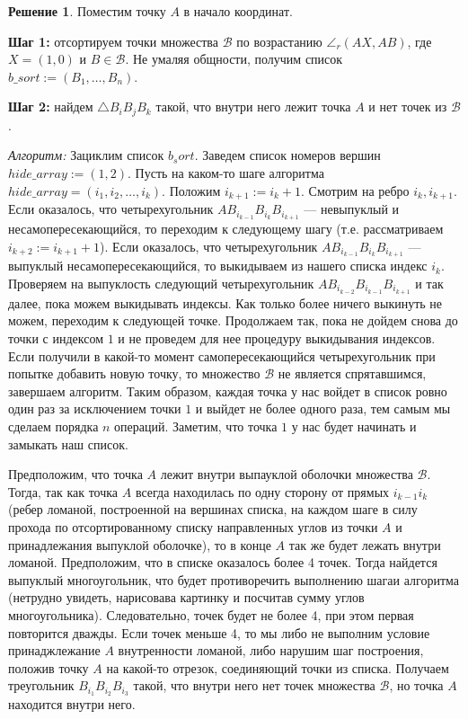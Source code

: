 \documentclass[12pt]{article}
\theoremstyle{definition}
\newtheorem*{solution}{Решение}
\theoremstyle{plain}
\theoremstyle{remark}
\begin{document}
\begin{solution}
    Поместим точку $A$ в начало координат.

    \textbf{Шаг 1:} отсортируем точки множества $\mathcal{B}$ по возрастанию $\angle_r (AX, AB)$, где $X = (1, 0)$ и $B \in \mathcal{B}$. Не умаляя общности, получим список $b\_sort := (B_1, \ldots, B_n)$.

    \textbf{Шаг 2:} найдем $\triangle B_iB_jB_k$ такой, что внутри него лежит точка $A$ и нет точек из $\mathcal{B}$.

    \textit{Алгоритм:}
    Зациклим список $b_sort$. Заведем список номеров вершин $hide\_array := (1, 2)$. Пусть на каком-то шаге алгоритма $hide\_array = (i_1, i_2, \ldots, i_k)$. Положим $i_{k + 1} := i_k + 1$. Смотрим на ребро $i_k, i_{k + 1}$. Если оказалось, что четырехугольник $AB_{i_{k - 1}}B_{i_k}B_{i_{k + 1}}$ --- невыпуклый и несамопересекающийся, то переходим к следующему шагу (т.е. рассматриваем $i_{k + 2} := i_{k + 1} + 1$). Если оказалось, что четырехугольник $AB_{i_{k - 1}}B_{i_k}B_{i_{k + 1}}$ --- выпуклый несамопересекающийся, то выкидываем из нашего списка индекс $i_k$. Проверяем на выпуклость следующий четырехугольник $AB_{i_{k - 2}}B_{i_{k - 1}}B_{i_{k + 1}}$ и так далее, пока можем выкидывать индексы. Как только более ничего выкинуть не можем, переходим к следующей точке. Продолжаем так, пока не дойдем снова до точки с индексом $1$ и не проведем для нее процедуру выкидывания индексов. Если получили в какой-то момент самопересекающийся четырехугольник при попытке добавить новую точку, то множество $\mathcal{B}$ не является спрятавшимся, завершаем алгоритм. Таким образом, каждая точка у нас войдет в список ровно один раз за исключением точки $1$ и выйдет не более одного раза, тем самым мы сделаем порядка $n$ операций. Заметим, что точка $1$ у нас будет начинать и замыкать наш список.

    Предположим, что точка $A$ лежит внутри выпауклой оболочки множества $\mathcal{B}$. Тогда, так как точка $A$ всегда находилась по одну сторону от прямых $i_{k-1}i_k$ (ребер ломаной, построенной на вершинах списка, на каждом шаге в силу прохода по отсортированному списку направленных углов из точки $A$ и принадлежания выпуклой оболочке), то в конце $A$ так же будет лежать внутри ломаной. Предположим, что в списке оказалось более 4 точек. Тогда найдется выпуклый многоугольник, что будет противоречить выполнению шагаи алгоритма (нетрудно увидеть, нарисовава картинку и посчитав сумму углов многоугольника). Следовательно, точек будет не более 4, при этом первая повторится дважды. Если точек меньше 4, то мы либо не выполним условие принаджлежание $A$ внутренности ломаной, либо нарушим шаг построения, положив точку $A$ на какой-то отрезок, соединяющий точки из списка. Получаем треугольник $B_{i_1}B_{i_2}B_{i_3}$ такой, что внутри него нет точек множества $\mathcal{B}$, но точка $A$ находится внутри него.


\end{solution}
\end{document}
